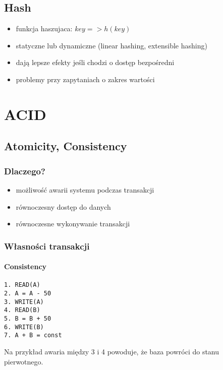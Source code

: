 \documentclass[12pt]{article}
\begin{document}
\subsection{Hash}
\begin{itemize}
\item funkcja haszujaca: $ key => h(key) $
\item statyczne lub dynamiczne (linear hashing, extensible hashing)
\item dają lepsze efekty jeśli chodzi o dostęp bezpośredni
\item problemy przy zapytaniach o zakres wartości
\end{itemize}

%
%
%
%
%
%

\section{ACID}
\subsection{Atomicity, Consistency}
\subsubsection{Dlaczego?}

\begin{itemize}
\item możliwość awarii systemu podczas transakcji
\item równoczesny dostęp do danych
\item równoczesne wykonywanie transakcji
\end{itemize}

\subsubsection{Własności transakcji}
\paragraph{Consistency}
\begin{verbatim}
1. READ(A)
2. A = A - 50
3. WRITE(A)
4. READ(B)
5. B = B + 50
6. WRITE(B)
7. A + B = const
\end{verbatim}
Na przykład awaria między 3 i 4 powoduje, że baza powróci do stanu pierwotnego.
\end{document}
